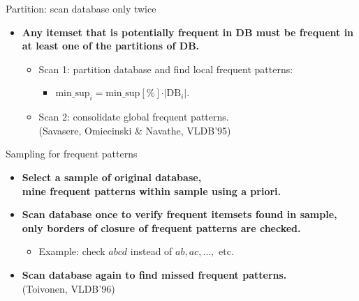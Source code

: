 \documentclass[aspectratio=169,t]{beamer}
\begin{document}
  {
    \begin{frame}{Partition: scan database only twice}
    \begin{itemize}
      \item \textbf{Any itemset that is potentially frequent in DB must be frequent in at least one of the partitions of DB.}
      \begin{itemize}
        \item Scan 1: partition database and find local frequent patterns:
        \begin{itemize}
          \item $\text{min\_sup}_i = \text{min\_sup}[\%] \cdot \vert \text{DB}_i \vert$.
        \end{itemize}
        \item Scan 2: consolidate global frequent patterns.\\
              (Savasere, Omiecinski \& Navathe, VLDB'95)
      \end{itemize}
      \vspace{0.5cm}
    \end{itemize}
    \centering
    \end{frame}
  }

  {
    \begin{frame}{Sampling for frequent patterns}
    \begin{itemize}
      \item \textbf{Select a sample of original database,\\
       mine frequent patterns within sample using a priori.}
      \item \textbf{Scan database once to verify frequent itemsets found in sample,\\
       only {\color{airforceblue}borders} of closure of frequent patterns are checked.}
      \begin{itemize}
        \item Example: check $abcd$ instead of $ab, ac, \ldots,$ etc.
      \end{itemize}
      \item \textbf{Scan database again to find missed frequent patterns.}\\
      (Toivonen, VLDB'96)
    \end{itemize}
    \end{frame}
  }
\end{document}
